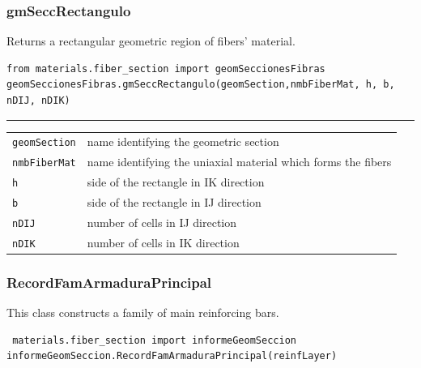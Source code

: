 \subsubsection{gmSeccRectangulo}
Returns a rectangular geometric region of fibers' material.
\noindent 
\begin{verbatim}
from materials.fiber_section import geomSeccionesFibras
geomSeccionesFibras.gmSeccRectangulo(geomSection,nmbFiberMat, h, b, nDIJ, nDIK)
\end{verbatim}
\vspace{-10pt}
{\color{grayLines} \rule{\linewidth}{0.25pt}}
\begin{center}
\begin{tabular}{lp{10cm}}
{\tt geomSection} & name identifying the geometric section \\
{\tt nmbFiberMat} & name identifying the uniaxial material which forms the fibers\\
{\tt h} & side of the rectangle in IK direction \\
{\tt b} & side of the rectangle in IJ direction \\
{\tt nDIJ} & number of cells in IJ direction \\
{\tt nDIK} & number of cells in IK direction \\
\end{tabular}
\end{center}


\subsubsection{RecordFamArmaduraPrincipal}
\noindent This class constructs a family of main reinforcing bars.
\begin{verbatim} materials.fiber_section import informeGeomSeccion
informeGeomSeccion.RecordFamArmaduraPrincipal(reinfLayer)
\end{verbatim}

